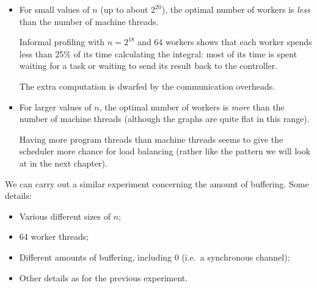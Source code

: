 \begin{slide}

\begin{itemize}
\item
For small values of $n$ (up to about $2^{20}$), the optimal number of workers
is \emph{less} than the number of machine threads.  

Informal profiling with $n = 2^{18}$ and 64 workers shows that each worker
spends less than 25\% of its time calculating the integral: most of its
time is spent waiting for a task or waiting to send its result back to the
controller.


The extra computation is dwarfed by the communication overheads. 



\item
For larger values of $n$, the optimal number of workers is \emph{more} than
the number of machine threads (although the graphs are quite flat in this
range).  

Having more program threads than machine threads seems to give the
scheduler more chance for load balancing (rather like the pattern we will
look at in the next chapter). 
\end{itemize}
\end{slide}


\begin{slide}

We can carry out a similar experiment concerning the amount of buffering.
Some details:
%
\begin{itemize}
\item Various different sizes of $n$;

\item 64 worker threads;

\item Different amounts of buffering, including 0 (i.e.~a synchronous
  channel);

\item Other details as for the previous experiment.
\end{itemize}
\end{slide}

